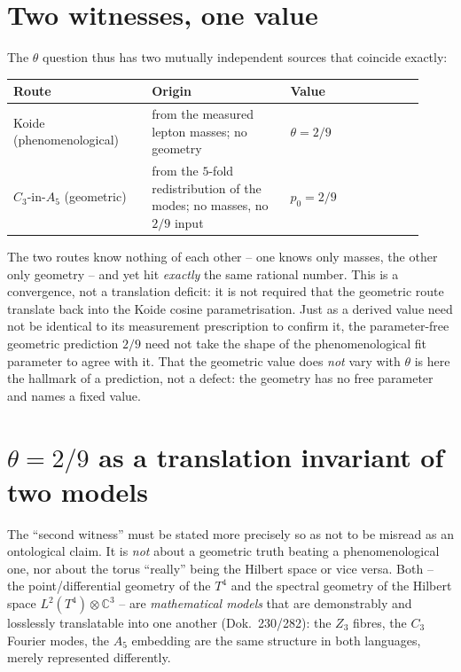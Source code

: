 \section{Two witnesses, one value}
The $\theta$ question thus has two mutually independent sources that coincide exactly:
\begin{center}
\begin{tabular}{@{}p{0.31\linewidth}p{0.31\linewidth}p{0.30\linewidth}@{}}
\toprule
\textbf{Route} & \textbf{Origin} & \textbf{Value}\\
\midrule
Koide (phenomenological) & from the measured lepton masses; no geometry & $\theta=2/9$\\
$C_3$-in-$A_5$ (geometric) & from the $5$-fold redistribution of the modes; no masses, no $2/9$ input & $p_0=2/9$\\
\bottomrule
\end{tabular}
\end{center}
The two routes know nothing of each other -- one knows only masses, the other only geometry --
and yet hit \emph{exactly} the same rational number. This is a convergence, not a translation
deficit: it is not required that the geometric route translate back into the Koide cosine
parametrisation. Just as a derived value need not be identical to its measurement prescription to
confirm it, the parameter-free geometric prediction $2/9$ need not take the shape of the
phenomenological fit parameter to agree with it. That the geometric value does \emph{not} vary
with $\theta$ is here the hallmark of a prediction, not a defect: the geometry has no free
parameter and names a fixed value.

\section{$\theta=2/9$ as a translation invariant of two models}
The \enquote{second witness} must be stated more precisely so as not to be misread as an
ontological claim. It is \emph{not} about a geometric truth beating a phenomenological one, nor
about the torus \enquote{really} being the Hilbert space or vice versa. Both -- the
point/differential geometry of the $T^4$ and the spectral geometry of the Hilbert space
$L^2(T^4)\otimes\mathbb{C}^3$ -- are \emph{mathematical models} that are demonstrably and
losslessly translatable into one another (Dok.~230/282): the $Z_3$ fibres, the $C_3$ Fourier
modes, the $A_5$ embedding are the same structure in both languages, merely represented
differently.

